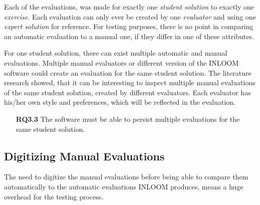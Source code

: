 Each of the evaluations, was made for exactly one \textit{student solution} to exactly one 
\textit{exercise}. Each evaluation can only ever be created by one \textit{evaluator} and 
using one \textit{expert solution} for reference. For testing purposes, there is no point 
in comparing an automatic evaluation to a manual one, if they differ in one of these attributes.

For one student solution, there can exist multiple automatic and manual evaluations. Multiple
manual evaluators or different version of the INLOOM software could create an evaluation for 
the same student solution. The literature research showed, that it can be interesting to inspect
multiple manual evaluations of the same student solution, created by different evaluators. Each
evaluator has his/her own style and preferences, which will be reflected in the evaluation.

\begin{itemize}
    \item[\textbf{RQ3.3}] The software must be able to persist multiple evaluations for the 
    same student solution. 
\end{itemize}

\subsection{Digitizing Manual Evaluations}
The need to digitize the manual evaluations before being able to compare them automatically
to the automatic evaluations INLOOM produces, means a huge overhead for the testing process. 